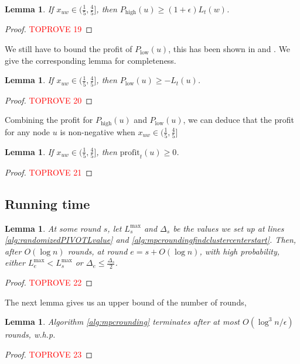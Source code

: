 \documentclass[11pt]{article}
\newtheorem{lemma}[theorem]{Lemma}
\newcommand{\profit}{\mathrm{profit}}
\newcommand{\onefive}{\frac{1}{5}}
\newcommand{\fourfive}{\frac{4}{5}}
\begin{document}
\begin{CJK*}{UTF8}{gbsn}
\begin{lemma}
\label{lem:highprofit}
If $x_{uw} \in (\onefive, \fourfive]$, then $P_{\textrm{high}}(u) \geq (1 + \epsilon) L_t(w)$.
\end{lemma}
\begin{proof}\textcolor{red}{TOPROVE 19}\end{proof}
We still have to bound the profit of $P_{\textrm{low}}(u)$, this has been shown in \cite{kalhan2019correlation} and \cite{davies2023fast}. We give the corresponding lemma for completeness. 
\begin{lemma}
\label{lem:lowprofit}
If $x_{uw} \in (\onefive, \fourfive]$, then $P_{\textrm{low}}(u) \geq - L_t(u)$.
\end{lemma}
\begin{proof}\textcolor{red}{TOPROVE 20}\end{proof}

Combining the profit for $P_{\textrm{high}}(u)$ and $P_{\textrm{low}}(u)$, we can deduce that the profit for any node $u$ is non-negative when $ x_{uw} \in (\onefive, \fourfive]$
\begin{lemma}
If $x_{uw} \in (\onefive, \fourfive]$, then $\profit_t(u) \geq 0$.
\end{lemma}
\begin{proof}\textcolor{red}{TOPROVE 21}\end{proof}

\subsection{Running time}

\begin{lemma}
\label{lem:mpcroundingrunningtimebase}
At some round $s$, let $L^{\max}_s$ and $\Delta_s$ be the values we set up at lines \ref{alg:randomizedPIVOTLvalue} and \ref{alg:mpcroundingfindclustercenterstart}. Then, after $O(\log n)$ rounds, at round $e = s + O(\log n)$, with high probability, either $L^{\max}_e < L^{\max}_s$ or $\Delta_e \leq \frac{\Delta_s}{2}$.
\end{lemma}

\begin{proof}\textcolor{red}{TOPROVE 22}\end{proof}
The next lemma gives us an upper bound of the number of rounds,

\begin{lemma}
\label{lem:mpcroundingtimelogn}
Algorithm \ref{alg:mpcrounding} terminates after at most $O(\log^3 n / \epsilon)$ rounds, w.h.p.
\end{lemma}
\begin{proof}\textcolor{red}{TOPROVE 23}\end{proof}


\end{CJK*}
\end{document}
